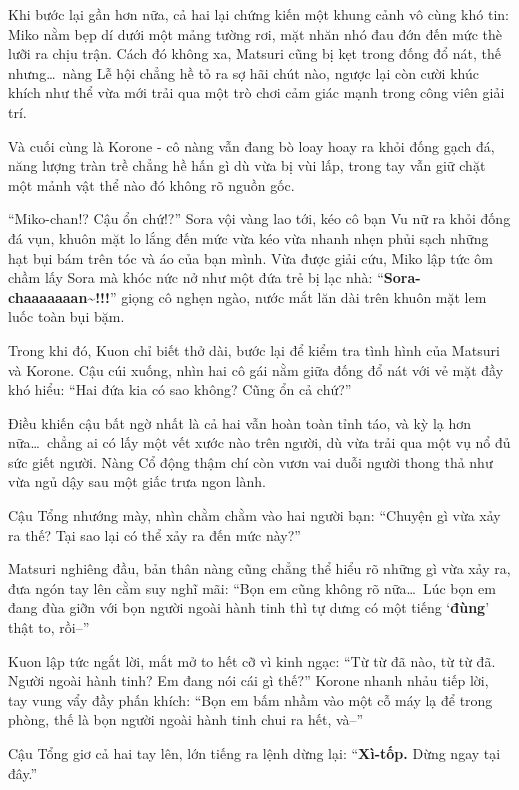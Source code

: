 \documentclass[../main.tex]{subfiles}
\begin{document}
Khi bước lại gần hơn nữa, cả hai lại chứng kiến một khung cảnh vô cùng khó tin: Miko nằm bẹp dí dưới một mảng tường rơi, mặt nhăn nhó đau đớn đến mức thè lưỡi ra chịu trận. Cách đó không xa, Matsuri cũng bị kẹt trong đống đổ nát, thế nhưng\dots\ nàng Lễ hội chẳng hề tỏ ra sợ hãi chút nào, ngược lại còn cười khúc khích như thể vừa mới trải qua một trò chơi cảm giác mạnh trong công viên giải trí.

Và cuối cùng là Korone - cô nàng vẫn đang bò loay hoay ra khỏi đống gạch đá, năng lượng tràn trề chẳng hề hấn gì dù vừa bị vùi lấp, trong tay vẫn giữ chặt một mảnh vật thể nào đó không rõ nguồn gốc.


``Miko-chan!? Cậu ổn chứ!?'' Sora vội vàng lao tới, kéo cô bạn Vu nữ ra khỏi đống đá vụn, khuôn mặt lo lắng đến mức vừa kéo vừa nhanh nhẹn phủi sạch những hạt bụi bám trên tóc và áo của bạn mình. Vừa được giải cứu, Miko lập tức ôm chầm lấy Sora mà khóc nức nở như một đứa trẻ bị lạc nhà: ``\textbf{Sora-chaaaaaaan\~{}!!!}'' giọng cô nghẹn ngào, nước mắt lăn dài trên khuôn mặt lem luốc toàn bụi bặm.

Trong khi đó, Kuon chỉ biết thở dài, bước lại để kiểm tra tình hình của Matsuri và Korone. Cậu cúi xuống, nhìn hai cô gái nằm giữa đống đổ nát với vẻ mặt đầy khó hiểu: ``Hai đứa kia có sao không? Cũng ổn cả chứ?''

Điều khiến cậu bất ngờ nhất là cả hai vẫn hoàn toàn tỉnh táo, và kỳ lạ hơn nữa\dots\ chẳng ai có lấy một vết xước nào trên người, dù vừa trải qua một vụ nổ đủ sức giết người. Nàng Cổ động thậm chí còn vươn vai duỗi người thong thả như vừa ngủ dậy sau một giấc trưa ngon lành.

Cậu Tổng nhướng mày, nhìn chằm chằm vào hai người bạn: ``Chuyện gì vừa xảy ra thế? Tại sao lại có thể xảy ra đến mức này?''

Matsuri nghiêng đầu, bản thân nàng cũng chẳng thể hiểu rõ những gì vừa xảy ra, đưa ngón tay lên cằm suy nghĩ mãi: ``Bọn em cũng không rõ nữa\dots\ Lúc bọn em đang đùa giỡn với bọn người ngoài hành tinh thì tự dưng có một tiếng `\textbf{đùng}' thật to, rồi--''

Kuon lập tức ngắt lời, mắt mở to hết cỡ vì kinh ngạc: ``Từ từ đã nào, từ từ đã. Người ngoài hành tinh? Em đang nói cái gì thế?'' Korone nhanh nhảu tiếp lời, tay vung vẩy đầy phấn khích: ``Bọn em bấm nhầm vào một cỗ máy lạ để trong phòng, thế là bọn người ngoài hành tinh chui ra hết, và--''

Cậu Tổng giơ cả hai tay lên, lớn tiếng ra lệnh dừng lại: ``\textbf{Xì-tốp.} Dừng ngay tại đây.''
\end{document}
